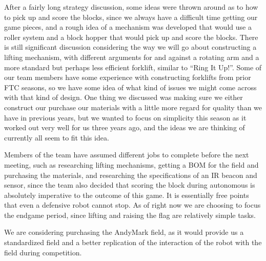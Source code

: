 \documentclass{article}
\begin{document}
After a fairly long strategy discussion, some ideas were thrown around as to how to pick up and score the blocks, since we always have a difficult time getting our game pieces, and a rough idea of a mechanism was developed that would use a roller system and a block hopper that would pick up and score the blocks. There is still significant discussion considering the way we will go about constructing a lifting mechanism, with different arguments for and against a rotating arm and a more standard but perhaps less efficient forklift, similar to ``Ring It Up!''. Some of our team members have some experience with constructing forklifts from prior FTC seasons, so we have some idea of what kind of issues we might come across with that kind of design. One thing we discussed was making sure we either construct our purchase our materials with a little more regard for quality than we have in previous years, but we wanted to focus on simplicity this season as it worked out very well for us three years ago, and the ideas we are thinking of currently all seem to fit this idea.

Members of the team have assumed different jobs to complete before the next meeting, such as researching lifting mechanisms, getting a BOM for the field and purchasing the materials, and researching the specifications of an IR beacon and sensor, since the team also decided that scoring the block during autonomous is absolutely imperative to the outcome of this game. It is essentially free points that even a defensive robot cannot stop. As of right now we are choosing to focus the endgame period, since lifting and raising the flag are relatively simple tasks. 

We are considering purchasing the AndyMark field, as it would provide us a standardized field and a better replication of the interaction of the robot with the field during competition. 
\end{document}
